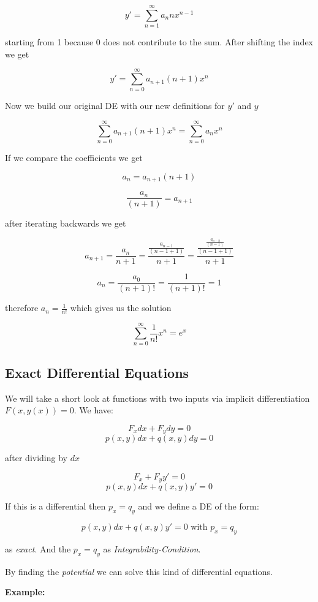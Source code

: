 \[
y' = \sum_{n = 1}^{\infty} a_n n x^{n - 1}
\]

starting from 1 because 0 does not contribute to the sum. After shifting the index we get

\[
y' = \sum_{n = 0}^{\infty} a_{n + 1}(n + 1)x^{n}
\]

Now we build our original DE with our new definitions for \(y'\) and \(y\)

\[
\sum_{n = 0}^{\infty} a_{n + 1}(n + 1)x^{n} = \sum_{n = 0}^{\infty} a_n x^n
\]

If we compare the coefficients we get

\[
a_n = a_{n+1}(n+1)
\]

\[
\frac{a_n}{(n + 1)} = a_{n+1}
\]


after iterating backwards we get

\[
a_{n + 1} = \frac{a_n}{n + 1} = \frac{\frac{a_{n - 1}}{(n - 1 +1)}}{n + 1} = \frac{\frac{\frac{a_{n - 2}}{(n - 1)}}{(n - 1 + 1)}}{n + 1}   
\]

\[
a_n = \frac{a_0}{(n + 1)!} = \frac{1}{(n + 1)!} = 1
\]

therefore \(a_n = \frac{1}{n!}\) which gives us the solution

\[\sum_{n = 0}^{\infty}\frac{1}{n!}x^n = e^x\]

\subsection{Exact Differential Equations}

We will take a short look at functions with two inputs via implicit differentiation \(F(x,y(x)) = 0\).
We have:

\[
F_x dx + F_y dy = 0
\]
\[
p(x,y)dx + q(x,y)dy = 0
\]

after dividing by \(dx\)

\[
F_x + F_y y' = 0
\]
\[
p(x,y)dx + q(x,y)y' = 0
\]

If this is a differential then \(p_x = q_y\) and we define a DE of the form:

\[
p(x,y)dx + q(x,y)y' = 0 \text{ with } p_x = q_y
\]

as \emph{exact}. And the \(p_x = q_y\) as \emph{Integrability-Condition}.
\vspace{\baselineskip}

By finding the \emph{potential} we can solve this kind of differential equations.
\vspace{\baselineskip}

\textbf{Example:}
\vspace{\baselineskip}

